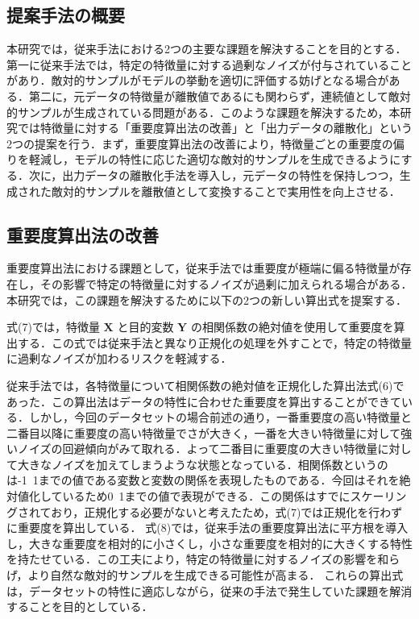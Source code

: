 \subsection{提案手法の概要}
本研究では，従来手法における2つの主要な課題を解決することを目的とする．第一に従来手法では，特定の特徴量に対する過剰なノイズが付与されていることがあり．敵対的サンプルがモデルの挙動を適切に評価する妨げとなる場合がある．第二に，元データの特徴量が離散値であるにも関わらず，連続値として敵対的サンプルが生成されている問題がある．このような課題を解決するため，本研究では特徴量に対する「重要度算出法の改善」と「出力データの離散化」という2つの提案を行う．まず，重要度算出法の改善により，特徴量ごとの重要度の偏りを軽減し，モデルの特性に応じた適切な敵対的サンプルを生成できるようにする．次に，出力データの離散化手法を導入し，元データの特性を保持しつつ，生成された敵対的サンプルを離散値として変換することで実用性を向上させる．

\subsection{重要度算出法の改善}
重要度算出法における課題として，従来手法では重要度が極端に偏る特徴量が存在し，その影響で特定の特徴量に対するノイズが過剰に加えられる場合がある．本研究では，この課題を解決するために以下の2つの新しい算出式を提案する．


式(7)では，特徴量 $\bm{X}$ と目的変数 $\bm{Y}$ の相関係数の絶対値を使用して重要度を算出する．この式では従来手法と異なり正規化の処理を外すことで，特定の特徴量に過剰なノイズが加わるリスクを軽減する．

従来手法では，各特徴量について相関係数の絶対値を正規化した算出法式(6)であった．この算出法はデータの特性に合わせた重要度を算出することができている．しかし，今回のデータセットの場合前述の通り，一番重要度の高い特徴量と二番目以降に重要度の高い特徴量でさが大きく，一番を大きい特徴量に対して強いノイズの回避傾向がみて取れる．よって二番目に重要度の大きい特徴量に対して大きなノイズを加えてしまうような状態となっている．相関係数というのは-1~1までの値である変数と変数の関係を表現したものである．今回はそれを絶対値化しているため0~1までの値で表現ができる．この関係はすでにスケーリングされており，正規化する必要がないと考えたため，式(7)では正規化を行わずに重要度を算出している．
式(8)では，従来手法の重要度算出法に平方根を導入し，大きな重要度を相対的に小さくし，小さな重要度を相対的に大きくする特性を持たせている．この工夫により，特定の特徴量に対するノイズの影響を和らげ，より自然な敵対的サンプルを生成できる可能性が高まる．
これらの算出式は，データセットの特性に適応しながら，従来の手法で発生していた課題を解消することを目的としている．

